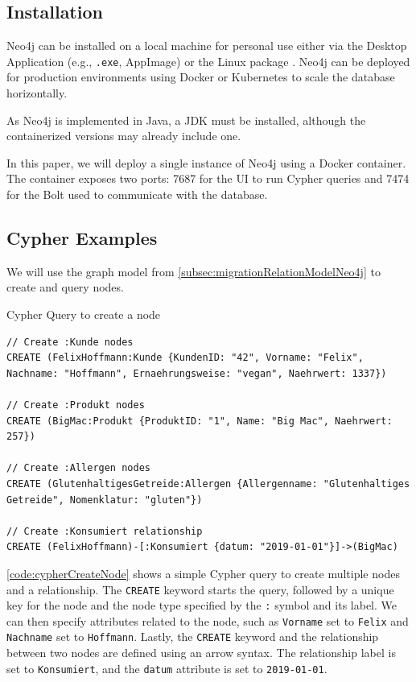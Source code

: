 \subsection{Installation} \label{subsec:installationNeo4j}

Neo4j can be installed on a local machine for personal use either via the Desktop Application (e.g., \texttt{.exe}, AppImage) or the Linux package \parencite{neo4j_neo4j_nodate}. Neo4j can be deployed for production environments using Docker \parencite{neo4j_docs_introduction_nodate} or Kubernetes to scale the database horizontally.

As Neo4j is implemented in Java, a \ac{JDK} must be installed, although the containerized versions may already include one.

In this paper, we will deploy a single instance of Neo4j using a Docker container. The container exposes two ports: \num{7687} for the \ac{UI} to run Cypher queries and \num{7474} for the \ac{Bolt} used to communicate with the database.

\subsection{Cypher Examples} \label{subsec:queryingNeo4j}

We will use the graph model from \autoref{subsec:migrationRelationModelNeo4j} to create and query nodes.

\begin{code}[H]
    \caption{Cypher Query to create a node} \label{code:cypherCreateNode}
    \begin{verbatim}
// Create :Kunde nodes
CREATE (FelixHoffmann:Kunde {KundenID: "42", Vorname: "Felix", Nachname: "Hoffmann", Ernaehrungsweise: "vegan", Naehrwert: 1337})

// Create :Produkt nodes
CREATE (BigMac:Produkt {ProduktID: "1", Name: "Big Mac", Naehrwert: 257})

// Create :Allergen nodes
CREATE (GlutenhaltigesGetreide:Allergen {Allergenname: "Glutenhaltiges Getreide", Nomenklatur: "gluten"})

// Create :Konsumiert relationship
CREATE (FelixHoffmann)-[:Konsumiert {datum: "2019-01-01"}]->(BigMac)
    \end{verbatim}
\end{code}

\autoref{code:cypherCreateNode} shows a simple Cypher query to create multiple nodes and a relationship. The \texttt{CREATE} keyword starts the query, followed by a unique key for the node and the node type specified by the \texttt{:} symbol and its label. We can then specify attributes related to the node, such as \texttt{Vorname} set to \texttt{Felix} and \texttt{Nachname} set to \texttt{Hoffmann}. Lastly, the \texttt{CREATE} keyword and the relationship between two nodes are defined using an arrow syntax. The relationship label is set to \texttt{Konsumiert}, and the \texttt{datum} attribute is set to \texttt{2019-01-01}.

